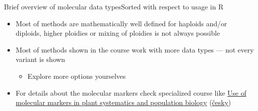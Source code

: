 \documentclass[compress, ucs, xelatex, 11pt, xcolor=svgnames, aspectratio=169,
	hyperref={
		bookmarks=true,
		unicode=true,
		colorlinks=true,
		pdftitle={Molecular data in R},
		plainpages=false,
		pdfauthor={Vojtech Zeisek},
		pdfsubject={Course about phylogeny and evolution in R},
		pdfcreator={XeLaTeX},
		pdfkeywords={R, evolution, phylogeny, molecular data},
		linkcolor=Crimson, %
		anchorcolor=Magenta, %
		citecolor=Magenta, %
		filecolor=Magenta, %
		menucolor=Magenta, %
		urlcolor=DodgerBlue, %
		pdftex},
	url={hyphens, lowtilde} %
	]{beamer}
\begin{document}
\begin{frame}[allowframebreaks]{Brief overview of molecular data types}{Sorted with respect to usage in R}
\begin{itemize}
\begin{itemize}
		\end{itemize}
		\item Most of methods are mathematically well defined for haploids and/or diploids, higher ploidies or mixing of ploidies is not always possible
		\item Most of methods shown in the course work with more data types --- not every variant is shown
		\begin{itemize}
			\item Explore more options yourselves
		\end{itemize}
		\item For details about the molecular markers check specialized course like \href{https://is.cuni.cz/studium/eng/predmety/index.php?do=predmet&kod=MB120P44}{Use of molecular markers in plant systematics and population biology} (\href{https://is.cuni.cz/studium/predmety/index.php?do=predmet&kod=MB120P44}{česky})
	\end{itemize}
\end{frame}
\end{document}
